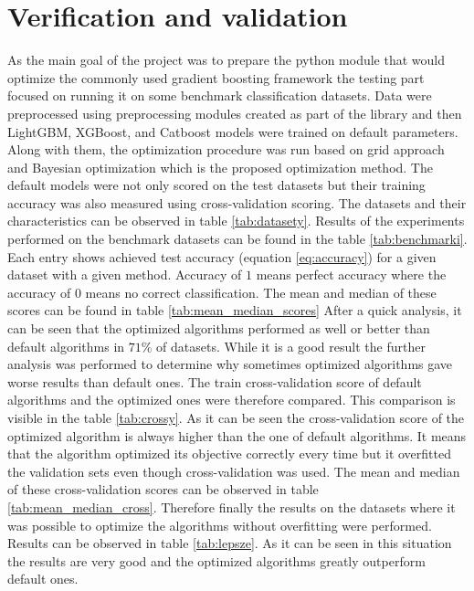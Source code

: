 \documentclass[a4paper,twoside,12pt]{book}
\begin{document}
\chapter{Verification and validation}


As the main goal of the project was to prepare the python module that would optimize the commonly used gradient boosting framework the testing part focused on running it on some benchmark classification datasets.
Data were preprocessed using preprocessing modules created as part of the library and then LightGBM, XGBoost, and Catboost models were trained on default parameters. Along with them, the optimization procedure was run based on grid approach and Bayesian optimization which is the proposed optimization method. The default models were not only scored on the test datasets but their training accuracy was also measured using cross-validation scoring.
The datasets and their characteristics can be observed in table \ref{tab:datasety}.
 Results of the experiments performed on the benchmark datasets can be found in the table \ref{tab:benchmarki}. Each entry shows achieved test accuracy (equation \ref{eq:accuracy}) for a given dataset with a given method.
 Accuracy of $1$ means perfect accuracy where the accuracy of $0$ means no correct classification.  The mean and median of these scores can be found in table \ref{tab:mean_median_scores}
After a quick analysis, it can be seen that the optimized algorithms performed as well or better than default algorithms in $71\%$ of datasets. 
While it is a good result the further analysis was performed to determine why sometimes optimized algorithms gave worse results than default ones.
The train cross-validation score of default algorithms and the optimized ones were therefore compared. This comparison is visible in the table \ref{tab:crossy}.
As it can be seen the cross-validation score of the optimized algorithm is always higher than the one of default algorithms. It means that the algorithm optimized its objective correctly every time but it overfitted the validation sets even though cross-validation was used. The mean and median of these cross-validation scores can be observed in table \ref{tab:mean_median_cross}.
Therefore finally the results on the datasets where it was possible to optimize the algorithms without overfitting were performed. Results can be observed in table \ref{tab:lepsze}. As it can be seen in this situation the results are very good and the optimized algorithms greatly outperform default ones.
\end{document}
